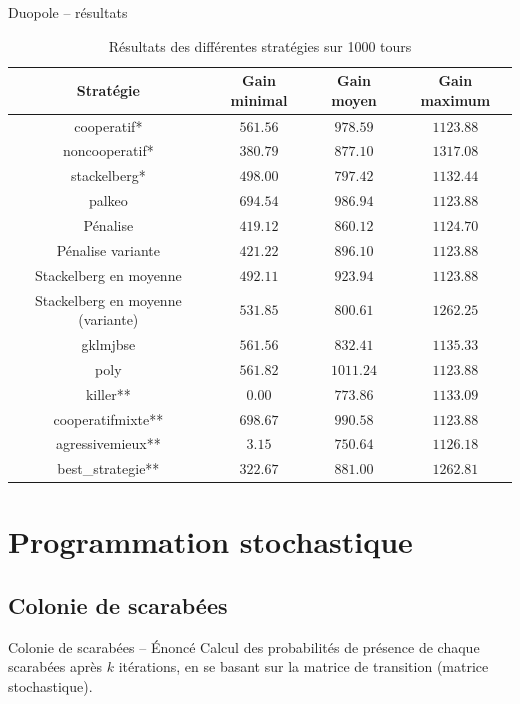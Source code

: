 \documentclass{beamer}
\begin{document}
\begin{frame}{Duopole -- résultats}
  \tiny{%
    \begin{table}[f]
      \centering
      \begin{tabular}{|c||c|c|c|}
        \hline
        Stratégie      & Gain minimal & Gain moyen & Gain maximum \\\hline\hline
         cooperatif* & $561.56$ & $978.59$ & $1123.88$ \\\hline
      noncooperatif* & $380.79$ & $877.10$ & $1317.08$ \\\hline
        stackelberg* & $498.00$ & $797.42$ & $1132.44$ \\\hline
              palkeo & $694.54$ & $986.94$ & $1123.88$ \\\hline
            Pénalise & $419.12$ & $860.12$ & $1124.70$ \\\hline
   Pénalise variante & $421.22$ & $896.10$ & $1123.88$ \\\hline
Stackelberg en moyenne & $492.11$ & $923.94$ & $1123.88$ \\\hline
Stackelberg en moyenne (variante) & $531.85$ & $800.61$ & $1262.25$ \\\hline
            gklmjbse & $561.56$ & $832.41$ & $1135.33$ \\\hline
                poly & $561.82$ & $1011.24$ & $1123.88$ \\\hline
            killer** & $  0.00$ & $773.86$ & $1133.09$ \\\hline
   cooperatifmixte** & $698.67$ & $990.58$ & $1123.88$ \\\hline
    agressivemieux** & $  3.15$ & $750.64$ & $1126.18$ \\\hline
   best\_strategie** & $322.67$ & $881.00$ & $1262.81$ \\\hline
      \end{tabular}
      \caption{Résultats des différentes stratégies sur 1000 tours}
      \label{table:coop_results2}
    \end{table}
  }
\end{frame}

\section{Programmation stochastique}
\subsection{Colonie de scarabées}
  \begin{frame}{Colonie de scarabées -- Énoncé}
    Calcul des probabilités de présence de chaque scarabées après $k$ itérations,
    en se basant sur la matrice de transition (matrice stochastique).
  \end{frame}
\end{document}
